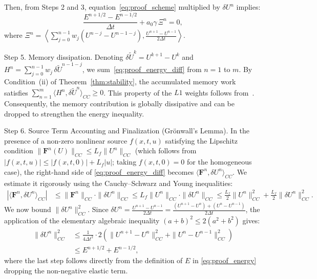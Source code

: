 \documentclass[a4paper,fleqn]{cas-sc}
\begin{document}
\begin{appendix}
Then, from Steps 2 and 3, equation~\eqref{eq:proof_scheme} multiplied by $\delta U^n$ implies:
\begin{equation}\label{eq:proof_energy_diff}
\frac{E^{n+1/2} - E^{n-1/2}}{\Delta t} + a_0 \gamma \, \Xi^n = 0,
\end{equation}
where $\Xi^n = \left\langle \sum_{j=0}^{n-1} w_j (U^{n-j}-U^{n-1-j}), \frac{U^{n+1} - U^{n-1}}{2 \Delta t} \right\rangle$.

Step 5. Memory dissipation. 
Denoting $\delta\tilde{U}^k = U^{k+1}-U^k$ and $H^n = \sum_{j=0}^{n-1} w_j\,\delta\tilde{U}^{n-1-j}$, we sum~\eqref{eq:proof_energy_diff} from $n=1$ to $m$. By Condition~(ii) of Theorem~\ref{thm:stability}, the accumulated memory work satisfies $\sum_{n=1}^m \langle H^n, \delta\tilde{U}^n\rangle_{CC} \ge 0$. This property of the $L1$ weights follows from~\cite{ref21,liao2018sharp}. Consequently, the memory contribution is globally dissipative and can be dropped to strengthen the energy inequality.

Step 6. Source Term Accounting and Finalization (Gr\"onwall's Lemma). 
In the presence of a non-zero nonlinear source $f(x,t,u)$ satisfying the Lipschitz condition $\|\mathbf{F}^n(U)\|_{CC} \le L_f \|U^n\|_{CC}$ (which follows from $|f(x,t,u)| \le |f(x,t,0)| + L_f|u|$; taking $f(x,t,0)=0$ for the homogeneous case), the right-hand side of \eqref{eq:proof_energy_diff} becomes $\langle \mathbf{F}^n, \delta U^n \rangle_{CC}$. We estimate it rigorously using the Cauchy--Schwarz and Young inequalities:
\begin{align*}
|\langle \mathbf{F}^n, \delta U^n \rangle_{CC}| &\le \|\mathbf{F}^n\|_{CC} \cdot \|\delta U^n\|_{CC} \le L_f \|U^n\|_{CC} \cdot \|\delta U^n\|_{CC} \le \frac{L_f}{2}\|U^n\|_{CC}^2 + \frac{L_f}{2}\|\delta U^n\|_{CC}^2.
\end{align*}
We now bound $\|\delta U^n\|_{CC}^2$. Since $\delta U^n = \frac{U^{n+1}-U^{n-1}}{2\Delta t} = \frac{(U^{n+1}-U^n)+(U^n-U^{n-1})}{2\Delta t}$, the application of the elementary algebraic inequality $(a+b)^2 \le 2(a^2+b^2)$ gives:
\begin{align*}
\|\delta U^n\|_{CC}^2 &\le \frac{1}{4\Delta t^2} \cdot 2\left(\|U^{n+1}-U^n\|_{CC}^2 + \|U^n-U^{n-1}\|_{CC}^2\right) \\
&\le E^{n+1/2} + E^{n-1/2},
\end{align*}
where the last step follows directly from the definition of $E$ in \eqref{eq:proof_energy} dropping the non-negative elastic term.


\end{appendix}
\end{document}
